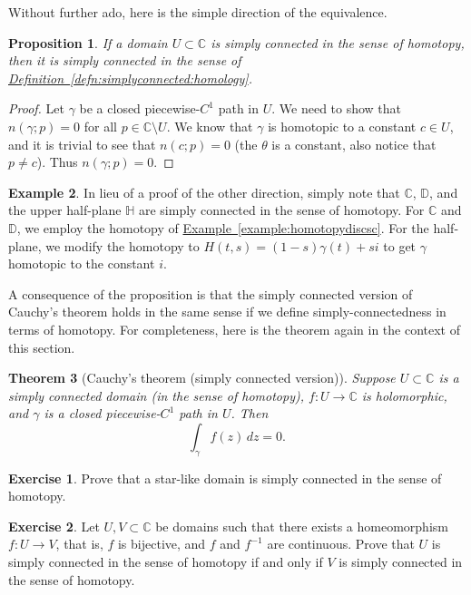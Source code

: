 \documentclass[12pt,openany]{book}
\newcommand{\C}{{\mathbb{C}}}
\newcommand{\D}{{\mathbb{D}}}
\newcommand{\bH}{{\mathbb{H}}}
\theoremstyle{plain}
\newtheorem{thm}{Theorem}[section]
\newtheorem{prop}[thm]{Proposition}
\theoremstyle{remark}
\theoremstyle{definition}
\newenvironment{exbox}{%
    \def\FrameCommand{\vrule width 1pt \relax\hspace{10pt}}%
    \MakeFramed{\advance\hsize-\width\FrameRestore}%
}{%
    \endMakeFramed
}
\theoremstyle{exercise}
\newtheorem{exercise}{Exercise}[section]
\theoremstyle{example}
\newtheorem{example}[thm]{Example}
\newcommand{\exampleref}[1]{\hyperref[#1]{Example~\ref*{#1}}}
\newcommand{\defnref}[1]{\hyperref[#1]{Definition~\ref*{#1}}}
\begin{document}
Without further ado, here is the simple direction of the equivalence.

\begin{prop} \label{prop:simplyconneasy}
If a domain $U \subset \C$ is simply connected in the sense of homotopy,
then it is simply connected in the sense
of \defnref{defn:simplyconnected:homology}.
\end{prop}

\begin{proof}
Let $\gamma$ be a closed piecewise-$C^1$ path in $U$.  We need to show
that $n(\gamma;p) = 0$ for all $p \in \C \setminus U$.
We know that $\gamma$ is homotopic to a constant $c \in U$, and it is
trivial to see that $n(c;p) = 0$ (the $\theta$
is a constant, also notice that $p \neq c$).
Thus $n(\gamma;p) = 0$.
\end{proof}

\begin{example}
In lieu of a proof of the other direction, simply note that
$\C$, $\D$, and the upper half-plane $\bH$ are simply connected in the 
sense of homotopy.  For $\C$ and $\D$, we employ the homotopy of
\exampleref{example:homotopydiscsc}.  For the half-plane,
we modify the homotopy to $H(t,s) = (1-s)\gamma(t) + si$ to
get $\gamma$ homotopic to the constant $i$.
\end{example}

A consequence of the proposition is that
the simply connected version of Cauchy's theorem holds in the same
sense if we define simply-connectedness in terms of homotopy.  For
completeness, here is the theorem again in the context of this section.

\begin{thm}[Cauchy's theorem (simply connected version)]
%
Suppose $U \subset \C$ is a simply connected domain (in the sense of
homotopy), $f \colon U \to \C$ is holomorphic,
and $\gamma$ is a closed piecewise-$C^1$ path in $U$.  Then
\begin{equation*}
\int_{\gamma} f(z) \, dz = 0 .
\end{equation*}
\end{thm}

\begin{exbox}
\begin{exercise}
Prove that a star-like domain is simply connected in the sense of homotopy.
\end{exercise}

\begin{exercise}
Let $U,V \subset \C$ be domains such that
there exists a homeomorphism
$f \colon U \to V$, that is, $f$ is bijective, and $f$ and $f^{-1}$ are
continuous.  Prove that $U$ is simply connected in the sense of homotopy if
and only if $V$ is simply connected in the sense of homotopy.
\end{exercise}
\end{exbox}
\end{document}
